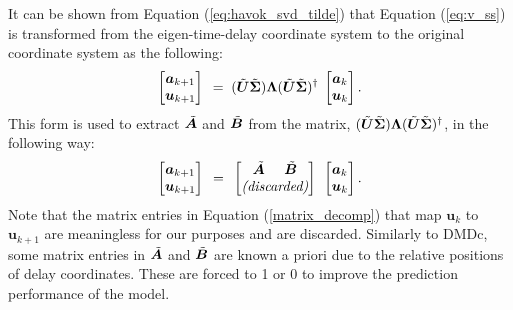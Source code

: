     It can be shown from Equation (\ref{eq:havok_svd_tilde}) that Equation (\ref{eq:v_ss}) is transformed from the eigen-time-delay coordinate system to the original coordinate system as the following:
    \begin{equation} \label{eq:v_ss_a} 
        \begin{bmatrix}
            \bm{a}_{k+1}  \\  \bm{u}_{k+1} 
        \end{bmatrix}
       \phantom{.} = \phantom{.} (\Tilde{\bm{U}} \Tilde{\bm{\Sigma}}) \bm{\Lambda} (\Tilde{\bm{U}}  \Tilde{\bm{\Sigma}})^{\dagger} \phantom{.}
        \begin{bmatrix}
            \bm{a}_{k}  \\  \bm{u}_{k} 
        \end{bmatrix} .
    \end{equation}    
    This form is used to extract $\Tilde{\bm{A}}$ and $\Tilde{\bm{B}}$ from the matrix,
    \( 
        (\Tilde{\bm{U}} \Tilde{\bm{\Sigma}}) \bm{\Lambda} (\Tilde{\bm{U}}  \Tilde{\bm{\Sigma}})^{\dagger}
    \), in the following way:
    \begin{equation} \label{matrix_decomp}
        \begin{bmatrix}
            \bm{a}_{k+1}  \\  \bm{u}_{k+1} 
        \end{bmatrix}
        \phantom{.} = \phantom{.} 
        \begin{bmatrix}
            \Tilde{\bm{A}} \phantom{.....} \Tilde{\bm{B}} \\
            \textit{(discarded)}
        \end{bmatrix}
        \phantom{.}
        \begin{bmatrix}
            \bm{a}_{k}  \\  \bm{u}_{k} 
        \end{bmatrix}.
    \end{equation}    
    Note that the matrix entries in Equation (\ref{matrix_decomp}) that map $\bm{u}_k$ to $\bm{u}_{k+1}$ are meaningless for our purposes and are discarded.
    Similarly to DMDc, some matrix entries in $\Tilde{\bm{A}}$ and $\Tilde{\bm{B}}$ are known a priori due to the relative positions of delay coordinates. These are forced to 1 or 0 to improve the prediction performance of the model.




